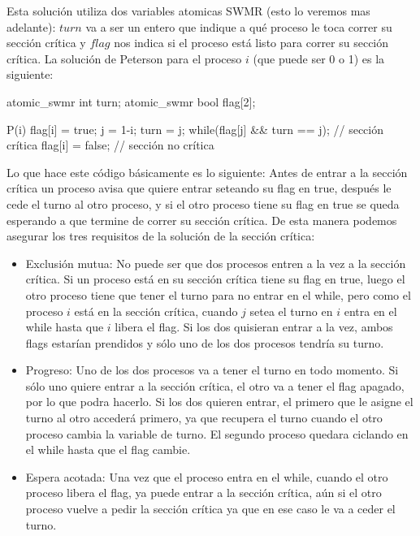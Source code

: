 \documentclass{article}
\begin{document}
Esta soluci\'on utiliza dos variables atomicas SWMR (esto lo veremos mas adelante): $turn$ va a ser un entero que indique a qu\'e proceso le toca correr su secci\'on cr\'itica y $flag$ nos indica si el proceso está listo para correr su secci\'on cr\'itica. La soluci\'on de Peterson para el proceso $i$ (que puede ser 0 o 1) es la siguiente:

\begin{code}
atomic_swmr int turn;
atomic_swmr bool flag[2];

P(i) {
    flag[i] = true;
    j = 1-i;
    turn = j;
    while(flag[j] && turn == j);
    // sección crítica
    flag[i] = false;
    // sección no crítica
}
\end{code}

Lo que hace este c\'odigo b\'asicamente es lo siguiente: Antes de entrar a la secci\'on cr\'itica un proceso avisa que quiere entrar seteando su flag en true, despu\'es le cede el turno al otro proceso, y si el otro proceso tiene su flag en true se queda esperando a que termine de correr su secci\'on cr\'itica. De esta manera podemos asegurar los tres requisitos de la soluci\'on de la secci\'on cr\'itica:

\begin{itemize}
\item Exclusi\'on mutua: No puede ser que dos procesos entren a la vez a la secci\'on cr\'itica. Si un proceso est\'a en su secci\'on cr\'itica tiene su flag en true, luego el otro proceso tiene que tener el turno para no entrar en el while, pero como el proceso $i$ est\'a en la secci\'on cr\'itica, cuando $j$ setea el turno en $i$ entra en el while hasta que $i$ libera el flag. Si los dos quisieran entrar a la vez, ambos flags estar\'ian prendidos y s\'olo uno de los dos procesos tendr\'ia su turno.
\item Progreso: Uno de los dos procesos va a tener el turno en todo momento. Si s\'olo uno quiere entrar a la secci\'on cr\'itica, el otro va a tener el flag apagado, por lo que podra hacerlo. Si los dos quieren entrar, el primero que le asigne el turno al otro accederá primero, ya que recupera el turno cuando el otro proceso cambia la variable de turno. El segundo proceso quedara ciclando en el while hasta que el flag cambie.
\item Espera acotada: Una vez que el proceso entra en el while, cuando el otro proceso libera el flag, ya puede entrar a la secci\'on cr\'itica, a\'un si el otro proceso vuelve a pedir la secci\'on cr\'itica ya que en ese caso le va a ceder el turno.
\end{itemize}
\end{document}
